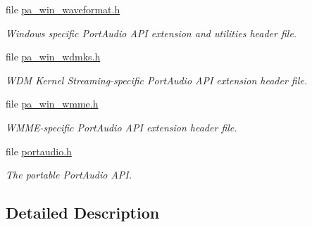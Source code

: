 \begin{DoxyCompactItemize}
file \hyperlink{pa__win__waveformat_8h}{pa\+\_\+win\+\_\+waveformat.\+h}
\begin{DoxyCompactList}\small\item\em Windows specific Port\+Audio A\+PI extension and utilities header file. \end{DoxyCompactList}\item 
file \hyperlink{pa__win__wdmks_8h}{pa\+\_\+win\+\_\+wdmks.\+h}
\begin{DoxyCompactList}\small\item\em W\+DM Kernel Streaming-\/specific Port\+Audio A\+PI extension header file. \end{DoxyCompactList}\item 
file \hyperlink{pa__win__wmme_8h}{pa\+\_\+win\+\_\+wmme.\+h}
\begin{DoxyCompactList}\small\item\em W\+M\+M\+E-\/specific Port\+Audio A\+PI extension header file. \end{DoxyCompactList}\item 
file \hyperlink{portaudio_8h}{portaudio.\+h}
\begin{DoxyCompactList}\small\item\em The portable Port\+Audio A\+PI. \end{DoxyCompactList}\end{DoxyCompactItemize}


\subsection{Detailed Description}
